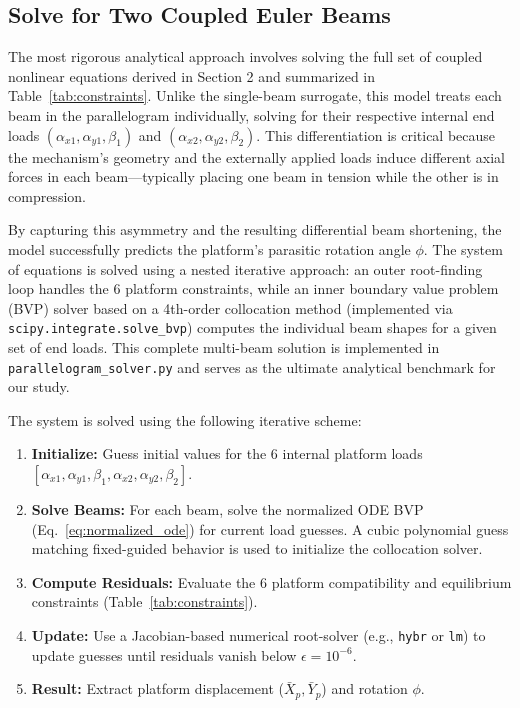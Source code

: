 \documentclass[colorlinks,upint,subscriptcorrection,varvw,hyphenate,balance]{asmeconf} %
\begin{document}
\subsection{Solve for Two Coupled Euler Beams}
\label{sec:euler}
The most rigorous analytical approach involves solving the full set of coupled nonlinear equations derived in Section 2 and summarized in Table~\ref{tab:constraints}. Unlike the single-beam surrogate, this model treats each beam in the parallelogram individually, solving for their respective internal end loads $(\alpha_{x1}, \alpha_{y1}, \beta_1)$ and $(\alpha_{x2}, \alpha_{y2}, \beta_2)$. This differentiation is critical because the mechanism's geometry and the externally applied loads induce different axial forces in each beam—typically placing one beam in tension while the other is in compression. 

By capturing this asymmetry and the resulting differential beam shortening, the model successfully predicts the platform's parasitic rotation angle $\phi$. The system of equations is solved using a nested iterative approach: an outer root-finding loop handles the 6 platform constraints, while an inner boundary value problem (BVP) solver based on a 4th-order collocation method (implemented via \texttt{scipy.integrate.solve\_bvp}) computes the individual beam shapes for a given set of end loads. This complete multi-beam solution is implemented in \texttt{parallelogram\_solver.py} and serves as the ultimate analytical benchmark for our study.

The system is solved using the following iterative scheme:
\begin{enumerate}
    \item \textbf{Initialize:} Guess initial values for the 6 internal platform loads $[\alpha_{x1}, \alpha_{y1}, \beta_1, \alpha_{x2}, \alpha_{y2}, \beta_2]$.
    \item \textbf{Solve Beams:} For each beam, solve the normalized ODE BVP (Eq.~\eqref{eq:normalized_ode}) for current load guesses. A cubic polynomial guess matching fixed-guided behavior is used to initialize the collocation solver.
    \item \textbf{Compute Residuals:} Evaluate the 6 platform compatibility and equilibrium constraints (Table~\ref{tab:constraints}).
    \item \textbf{Update:} Use a Jacobian-based numerical root-solver (e.g., \texttt{hybr} or \texttt{lm}) to update guesses until residuals vanish below $\epsilon = 10^{-6}$.
    \item \textbf{Result:} Extract platform displacement ($\bar{X}_p, \bar{Y}_p$) and rotation $\phi$.
\end{enumerate}
\end{document}
